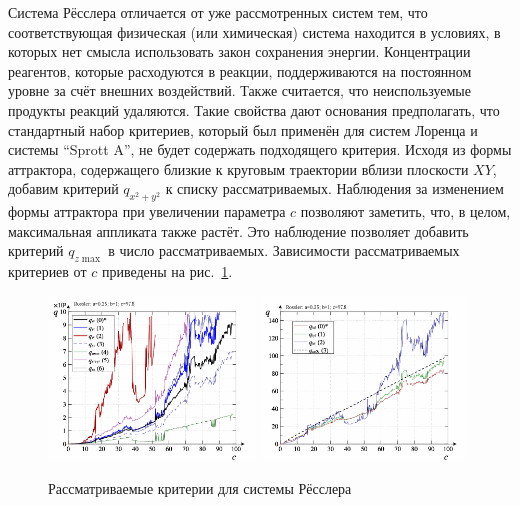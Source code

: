 Система Рёсслера отличается от уже рассмотренных систем тем,
что соответствующая физическая (или химическая) система
находится в условиях, в которых нет смысла использовать
закон сохранения энергии. Концентрации реагентов,
которые расходуются в реакции, поддерживаются на постоянном уровне
за счёт внешних воздействий. Также считается,
что неиспользуемые продукты реакций удаляются.
Такие свойства дают основания предполагать,
что стандартный набор критериев, который был применён для
систем Лоренца и системы ``Sprott A'', не будет
содержать подходящего критерия. Исходя из формы аттрактора,
содержащего близкие к круговым траектории вблизи плоскости $XY$,
добавим критерий $q_{x^2+y^2}$ к списку рассматриваемых.
Наблюдения за изменением формы аттрактора при увеличении параметра $c$
позволяют заметить, что, в целом, максимальная аппликата также
растёт. Это наблюдение позволяет добавить критерий $q_{z \max{}}$
в число рассматриваемых. Зависимости рассматриваемых критериев от $c$
приведены на рис.~\ref{atu:f:ross_q}.



\begin{figure}[ht!]
\begin{center}
  \includegraphics[width=0.49\textwidth]{p/cha/ross/ross_q-p_q.png}
  \hfill
  \includegraphics[width=0.49\textwidth]{p/cha/ross/ross_q-p_q1.png}
\end{center}
  \caption{Рассматриваемые критерии для системы Рёсслера}
\label{atu:f:ross_q}
\end{figure}

